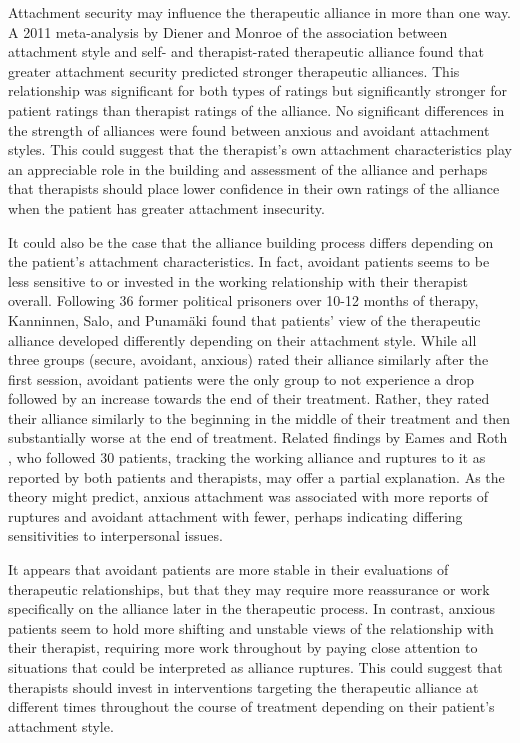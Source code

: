 \documentclass[12pt]{report}
\begin{document}
Attachment security may influence the therapeutic alliance in more than one way.
A 2011 meta-analysis by Diener and Monroe \citeyear{Diener2011} of the association between attachment style and self- and therapist-rated therapeutic alliance found that greater attachment security predicted stronger therapeutic alliances. This relationship was significant for both types of ratings but significantly stronger for patient ratings than therapist ratings of the alliance.
No significant differences in the strength of alliances were found between anxious and avoidant attachment styles.
This could suggest that the therapist's own attachment characteristics play an appreciable role in the building and assessment of the alliance and perhaps that therapists should place lower confidence in their own ratings of the alliance when the patient has greater attachment insecurity.

It could also be the case that the alliance building process differs depending on the patient's attachment characteristics.
In fact, avoidant patients seems to be less sensitive to or invested in the working relationship with their therapist overall. Following 36 former political prisoners over 10-12 months of therapy, Kanninnen, Salo, and Punamäki \citeyear{Kanninen2000} found that patients' view of the therapeutic alliance developed differently depending on their attachment style.
While all three groups (secure, avoidant, anxious) rated their alliance similarly after the first session, avoidant patients were the only group to not experience a drop followed by an increase towards the end of their treatment.
Rather, they rated their alliance similarly to the beginning in the middle of their treatment and then substantially worse at the end of treatment.
Related findings by Eames and Roth \citeyear{Eames2000}, who followed 30 patients, tracking the working alliance and ruptures to it as reported by both patients and therapists, may offer a partial explanation.
As the theory might predict, anxious attachment was associated with more reports of ruptures and avoidant attachment with fewer, perhaps indicating differing sensitivities to interpersonal issues.

It appears that avoidant patients are more stable in their evaluations of therapeutic relationships, but that they may require more reassurance or work specifically on the alliance later in the therapeutic process.
In contrast, anxious patients seem to hold more shifting and unstable views of the relationship with their therapist, requiring more work throughout by paying close attention to situations that could be interpreted as alliance ruptures.
This could suggest that therapists should invest in interventions targeting the therapeutic alliance at different times throughout the course of treatment depending on their patient's attachment style.
\end{document}
